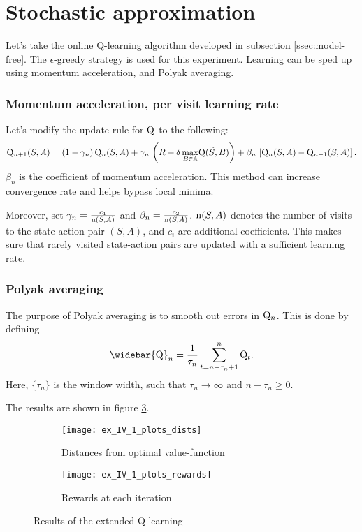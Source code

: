 \section{Stochastic approximation}

Let's take the online Q-learning algorithm developed in subsection \ref{ssec:model-free}.
The $\epsilon$-greedy strategy is used for this experiment.
Learning can be sped up using momentum acceleration, and Polyak averaging.

\subsubsection*{Momentum acceleration, per visit learning rate}

Let's modify the update rule for $\mathrm{Q}$ to the following:
\begin{equation}
	\mathrm{Q}_{n+1}(S, A) = (1 - \gamma_n)\,\mathrm{Q}_n(S, A) +
		\gamma_n\,\left(R + \delta\,\underset{B\in\mathbb{A}}{\max}\mathrm{Q}(\widetilde{S}, B)\right) +
		\beta_n\,\left[\mathrm{Q}_n(S, A) - \mathrm{Q}_{n-1}(S, A)\right].
\end{equation}
$\beta_n$ is the coefficient of momentum acceleration. This method can increase convergence rate
and helps bypass local minima.

Moreover, set $\gamma_n = \frac{c_1}{\mathrm{n}(S, A)}$ and $\beta_n = \frac{c_2}{\mathrm{n}(S, A)}$.
$\mathrm{n}(S, A)$ denotes the number of visits to the state-action pair $(S, A)$, and $c_i$ are additional
coefficients.
This makes sure that rarely visited state-action pairs are updated with a sufficient learning rate.

\subsubsection*{Polyak averaging}

The purpose of Polyak averaging is to smooth out errors in $\mathrm{Q}_n$.
This is done by defining
\begin{equation}
	\widebar{\fn{Q}}_n = \frac{1}{\tau_n}\sum\limits_{t=n-\tau_n+1}^n\fn{Q}_t.
\end{equation}
Here, $\{\tau_n\}$ is the window width, such that $\tau_n\rightarrow\infty$ and $n-\tau_n\geq 0 $.

The results are shown in figure \ref{fig:extension}.

\begin{figure}[H]
	\centering
	\begin{subfigure}{.49\textwidth}
		\centering
		\texttt{[image: ex\_IV\_1\_plots\_dists]}
		\caption{Distances from optimal value-function}
		\label{}
	\end{subfigure}\hfill
	\begin{subfigure}{.49\textwidth}
		\centering
		\texttt{[image: ex\_IV\_1\_plots\_rewards]}
		\caption{Rewards at each iteration}
		\label{}
	\end{subfigure}
	\caption{Results of the extended Q-learning}
	\label{fig:extension}
\end{figure}
